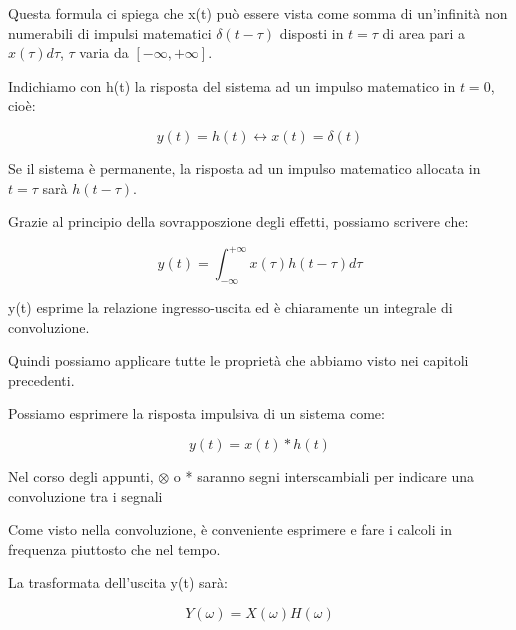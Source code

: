 Questa formula ci spiega che x(t) può essere vista come somma di un'infinità non numerabili di impulsi matematici 
$\delta (t - \tau)$ disposti in $t = \tau$ di area pari a $x(\tau) d\tau$, $\tau$ varia da $[-\infty, +\infty]$. \newline 

Indichiamo con h(t) la risposta del sistema ad un impulso matematico in $t=0$, cioè: 

{
    \Large 
    \begin{equation}
        y(t) = h(t) \leftrightarrow x(t) = \delta(t)
    \end{equation}
}

Se il sistema è permanente, la risposta ad un impulso matematico allocata in $t = \tau$ sarà $h(t - \tau)$. \newline 

Grazie al principio della sovrapposzione degli effetti, possiamo scrivere che: 

{
    \Large 
    \begin{equation}
        y(t) = \int_{-\infty}^{+\infty}
        x(\tau) h (t - \tau) d\tau
    \end{equation}
}

y(t) esprime la relazione ingresso-uscita ed è chiaramente un integrale di convoluzione. \newline 

Quindi possiamo applicare tutte le proprietà che abbiamo visto nei capitoli precedenti. \newline 

Possiamo esprimere la risposta impulsiva di un sistema come: 

{
    \Large 
    \begin{equation}
        y(t) = x(t) * h(t)
    \end{equation}
}

\begin{tcolorbox}
Nel corso degli appunti, $\otimes$  o * saranno segni interscambiali per indicare una convoluzione tra i segnali     
\end{tcolorbox}

Come visto nella convoluzione, è conveniente esprimere e fare i calcoli in frequenza piuttosto che nel tempo. \newline 

La trasformata dell'uscita y(t) sarà: 

{
    \Large 
    \begin{equation}
        Y(\omega) = X(\omega)H(\omega) 
    \end{equation}
}

